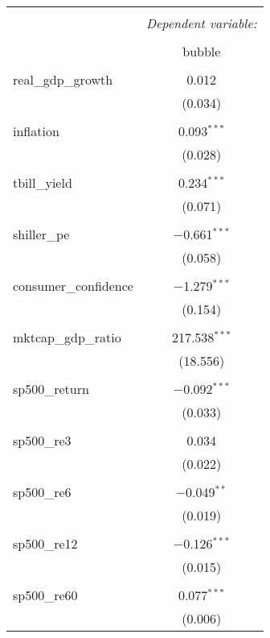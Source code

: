 
\begin{table}[!htbp] \centering 
  \caption{} 
  \label{tab:logit} 
\begin{tabular}{@{\extracolsep{5pt}}lc} 
\\[-1.8ex]\hline 
\hline \\[-1.8ex] 
 & \multicolumn{1}{c}{\textit{Dependent variable:}} \\ 
\cline{2-2} 
\\[-1.8ex] & bubble \\ 
\hline \\[-1.8ex] 
 real\_gdp\_growth & 0.012 \\ 
  & (0.034) \\ 
  & \\ 
 inflation & 0.093$^{***}$ \\ 
  & (0.028) \\ 
  & \\ 
 tbill\_yield & 0.234$^{***}$ \\ 
  & (0.071) \\ 
  & \\ 
 shiller\_pe & $-$0.661$^{***}$ \\ 
  & (0.058) \\ 
  & \\ 
 consumer\_confidence & $-$1.279$^{***}$ \\ 
  & (0.154) \\ 
  & \\ 
 mktcap\_gdp\_ratio & 217.538$^{***}$ \\ 
  & (18.556) \\ 
  & \\ 
 sp500\_return & $-$0.092$^{***}$ \\ 
  & (0.033) \\ 
  & \\ 
 sp500\_re3 & 0.034 \\ 
  & (0.022) \\ 
  & \\ 
 sp500\_re6 & $-$0.049$^{**}$ \\ 
  & (0.019) \\ 
  & \\ 
 sp500\_re12 & $-$0.126$^{***}$ \\ 
  & (0.015) \\ 
  & \\ 
 sp500\_re60 & 0.077$^{***}$ \\ 
  & (0.006) \\ 

\end{tabular}
\end{table}
